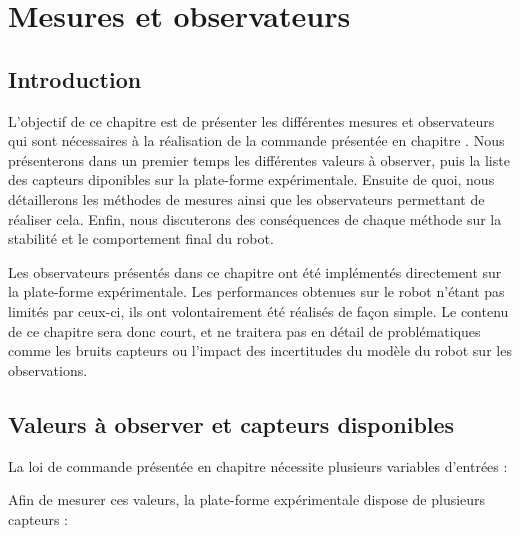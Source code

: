 \chapter{Mesures et observateurs}
	\section{Introduction}
	
		L'objectif de ce chapitre est de présenter les différentes mesures et observateurs qui sont nécessaires à la réalisation de la commande présentée en chapitre .
		Nous présenterons dans un premier temps les différentes valeurs à observer, puis la liste des capteurs diponibles sur la plate-forme expérimentale.
		Ensuite de quoi, nous détaillerons les méthodes de mesures ainsi que les observateurs permettant de réaliser cela. 
		Enfin, nous discuterons des conséquences de chaque méthode sur la stabilité et le comportement final du robot.
		
		Les observateurs présentés dans ce chapitre ont été implémentés directement sur la plate-forme expérimentale. 
		Les performances obtenues sur le robot n'étant pas limités par ceux-ci, ils ont volontairement été réalisés de façon simple.
		Le contenu de ce chapitre sera donc court, et ne traitera pas en détail de problématiques comme les bruits capteurs ou l'impact des incertitudes du modèle du robot sur les observations.
	
	\section{Valeurs à observer et capteurs disponibles}
	
		La loi de commande présentée en chapitre  nécessite plusieurs variables d'entrées :
		
		Afin de mesurer ces valeurs, la plate-forme expérimentale dispose de plusieurs capteurs :
		
